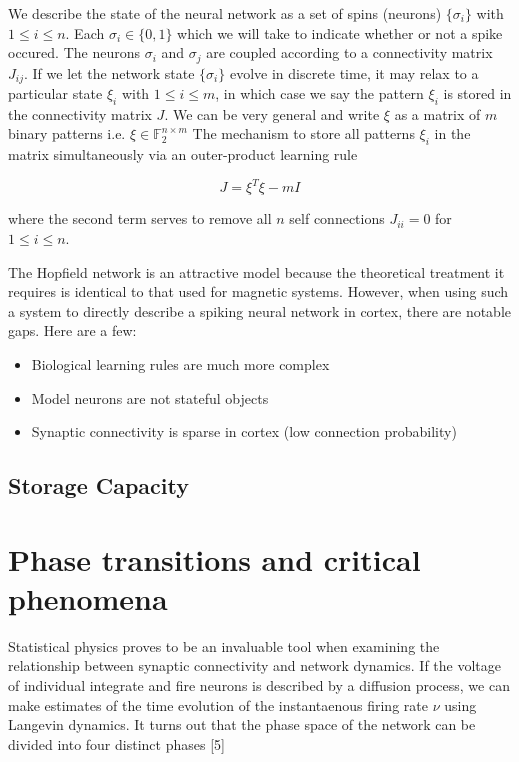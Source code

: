 \documentclass{article} %
\begin{document}
We describe the state of the neural network as a set of spins (neurons) $\{\sigma_{i}\}$ with $1 \leq i \leq n$. Each $\sigma_{i} \in \{0,1\}$  which we will take to indicate whether or not a spike occured. The neurons $\sigma_{i}$ and $\sigma_{j}$ are coupled according to a connectivity matrix $J_{ij}$. If we let the network state $\{\sigma_{i}\}$ evolve in discrete time, it may relax to a particular state $\xi_{i}$ with $1 \leq i \leq m$, in which case we say the pattern $\xi_{i}$ is stored in the connectivity matrix $J$. We can be very general and write $\xi$ as a matrix of $m$ binary patterns i.e. $\xi \in \mathbb{F}_{2}^{n\times m}$ The mechanism to store all patterns $\xi_{i}$ in the matrix simultaneously via an outer-product learning rule

\begin{equation*}
J = \xi^{T}\xi - mI
\end{equation*}

where the second term serves to remove all $n$ self connections $J_{ii} = 0$ for $1 \leq i \leq n$. 


The Hopfield network is an attractive model because the theoretical treatment it requires is identical to that used for magnetic systems. However, when using such a system to directly describe a spiking neural network in cortex, there are notable gaps. Here are a few:

\begin{itemize}
  \item Biological learning rules are much more complex
  \item Model neurons are not stateful objects
  \item Synaptic connectivity is sparse in cortex (low connection probability)
\end{itemize}


\subsection{Storage Capacity}




\section{Phase transitions and critical phenomena}

Statistical physics proves to be an invaluable tool when examining the relationship between synaptic connectivity and network dynamics. If the voltage of individual integrate and fire neurons is described by a diffusion process, we can make estimates of the time evolution of the instantaenous firing rate $\nu$ using Langevin dynamics. It turns out that the phase space of the network can be divided into four distinct phases [5]
\end{document}

